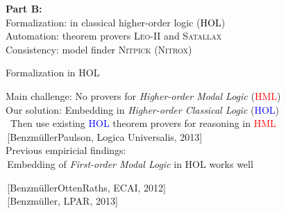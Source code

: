 \begin{transitionframe}{}
\textbf{Part B:} \\
\quad Formalization: \hfill in classical higher-order logic (\textcolor{black}{HOL}) \\
\quad Automation: \hfill theorem provers \textsc{Leo-II} and \textsc{Satallax} \\ 
\quad Consistency: \hfill model finder \textsc{Nitpick (Nitrox)} \\
\end{transitionframe}

\begin{frame}{Formalization in HOL} \large

Main challenge: \hfill No provers for \emph{Higher-order Modal
  Logic\/} (\textcolor{red}{HML}) \\[1em]

Our solution: \hfill Embedding in \emph{Higher-order Classical
  Logic\/} (\textcolor{blue}{HOL}) \\
\, \hfill Then use existing \textcolor{blue}{HOL} theorem provers for reasoning in \textcolor{red}{HML} \\
\,\hfill {\small [Benzm\"ullerPaulson, Logica Universalis, 2013]}
\\[2em]

Previous empiricial findings:  \\[.5em]
\,\hfill Embedding of  \emph{First-order Modal Logic} in HOL works well 

\,\hfill {\small [Benzm\"ullerOttenRaths, ECAI, 2012]} \\
\,\hfill {\small [Benzm\"uller, LPAR, 2013]}
\end{frame}




